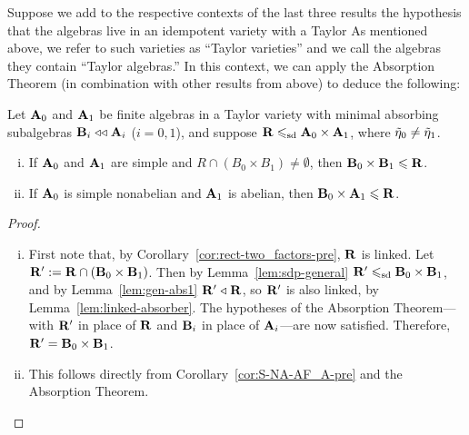   Suppose we add to the respective contexts of the last three results the hypothesis
  that the algebras live in an idempotent variety with a Taylor
  As mentioned above, we refer to such varieties as ``Taylor varieties'' and we call the
  algebras they contain ``Taylor algebras.'' In this context, we can apply the
  Absorption Theorem (in combination with other results from above) to
  deduce the following:

  \begin{lemma}
    \label{lem:rect-two_factors}
    Let $\mathbf{A}_0$ and $\mathbf{A}_1$ be finite  algebras in a Taylor variety
    with minimal absorbing subalgebras $\mathbf{B}_i\mathrel{\triangleleft\triangleleft} \mathbf{A}_i$ ($i =0,1$),
    and suppose $\mathbf{R} \leqslant_{\mathrm{sd}} \mathbf{A}_0 \times \mathbf{A}_1$, where $\tilde{\eta}_0 \neq \tilde{\eta}_1$.
    \begin{enumerate}[(i)]
    \item If $\mathbf{A}_0$ and $\mathbf{A}_1$ are simple and $R\cap (B_0 \times B_1) \neq \emptyset$, then
      $\mathbf{B}_0 \times \mathbf{B}_1\leqslant \mathbf{R}$. 
    \item  If $\mathbf{A}_0$ is simple nonabelian and $\mathbf{A}_1$ is abelian,
      then $\mathbf{B}_0 \times \mathbf{A}_1 \leqslant \mathbf{R}$.
    \end{enumerate}
  \end{lemma}
    \begin{proof}
      \begin{enumerate}[(i)]
      \item First note that, by Corollary~\ref{cor:rect-two_factors-pre}, $\mathbf{R}$ is linked.
        Let $\mathbf{R}':= \mathbf{R} \cap (\mathbf{B}_0 \times \mathbf{B}_1)$. Then by
        Lemma~\ref{lem:sdp-general} $\mathbf{R}' \leqslant_{\mathrm{sd}} \mathbf{B}_0 \times \mathbf{B}_1$,
        and by Lemma~\ref{lem:gen-abs1} $\mathbf{R}'\mathrel{\triangleleft} \mathbf{R}$, so $\mathbf{R}'$ is also
        linked, by Lemma~\ref{lem:linked-absorber}.  The hypotheses of the
        Absorption Theorem---with $\mathbf{R}'$ in place of $\mathbf{R}$ and $\mathbf{B}_i$
        in place of $\mathbf{A}_i$---are now satisfied.  Therefore, 
        $\mathbf{R}' = \mathbf{B}_0 \times \mathbf{B}_1$.
      \item This follows directly from Corollary~\ref{cor:S-NA-AF_A-pre} and the
        Absorption Theorem.
      \end{enumerate}
    \end{proof}


